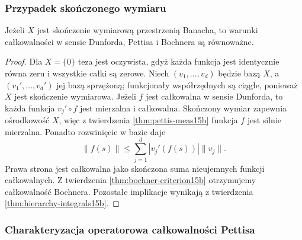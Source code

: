 \subsubsection{Przypadek skończonego wymiaru}

\begin{wniosek}
\label{cor:finite-dimensional-vector-integrals15b}
Jeżeli $X$ jest skończenie wymiarową przestrzenią Banacha,
to warunki całkowalności w sensie Dunforda, Pettisa i Bochnera
są równoważne.
\end{wniosek}
\begin{proof}
Dla $X=\{0\}$ teza jest oczywista, gdyż każda funkcja
jest identycznie równa zeru i wszystkie całki są zerowe.
Niech $(v_1,\ldots,v_d)$ będzie bazą $X$, a
$(v_1',\ldots,v_d')$ jej bazą sprzężoną; funkcjonały
współrzędnych są ciągłe, ponieważ $X$ jest skończenie
wymiarowa. Jeżeli $f$ jest całkowalna w sensie Dunforda,
to każda funkcja $v_j'\circ f$ jest mierzalna i całkowalna.
Skończony wymiar zapewnia ośrodkowość $X$, więc
z twierdzenia \ref{thm:pettis-meas15b} funkcja $f$
jest silnie mierzalna. Ponadto rozwinięcie w bazie daje
\[
 \|f(s)\|\le\sum_{j=1}^d |v_j'(f(s))|\|v_j\|.
\]
Prawa strona jest całkowalna jako skończona suma
nieujemnych funkcji całkowalnych.
Z twierdzenia \ref{thm:bochner-criterion15b} otrzymujemy
całkowalność Bochnera. Pozostałe implikacje wynikają
z twierdzenia \ref{thm:hierarchy-integrals15b}.
\end{proof}

\subsubsection{Charakteryzacja operatorowa całkowalności Pettisa}

